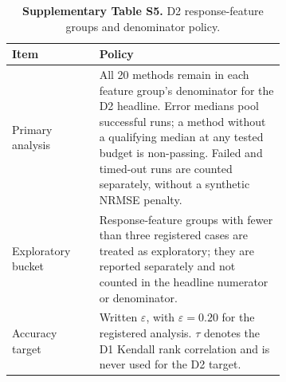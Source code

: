 \begin{table}[htbp]
\centering
\caption{\textbf{Supplementary Table S5.} D2 response-feature groups and denominator policy.}
\label{tab:si_d2_policy}
\SITableFont
\begin{tabular}{@{}lp{0.68\linewidth}@{}}
\toprule
\textbf{Item} & \textbf{Policy} \\
\midrule
Primary analysis & All 20 methods remain in each feature group's denominator for the D2 headline. Error medians pool successful runs; a method without a qualifying median at any tested budget is non-passing. Failed and timed-out runs are counted separately, without a synthetic NRMSE penalty. \\
Exploratory bucket & Response-feature groups with fewer than three registered cases are treated as exploratory; they are reported separately and not counted in the headline numerator or denominator. \\
Accuracy target & Written $\varepsilon$, with $\varepsilon=0.20$ for the registered analysis. $\tau$ denotes the D1 Kendall rank correlation and is never used for the D2 target. \\
\bottomrule
\end{tabular}
\end{table}
